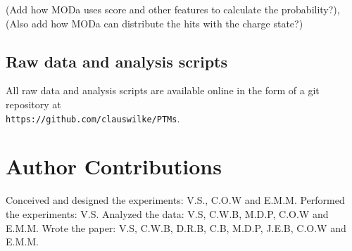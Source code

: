 \documentclass[12pt]{article}
\begin{document}




(Add how MODa uses score and other features to calculate the probability?), (Also add how MODa can distribute the hits with the charge state?)

\subsection{Raw data and analysis scripts}

All raw data and analysis scripts are available online in the form of a git repository at\\ \texttt{https://github.com/clauswilke/PTMs}.


\section{Author Contributions}
Conceived and designed the experiments: V.S., C.O.W and E.M.M. Performed the experiments: V.S. Analyzed the data: V.S, C.W.B, M.D.P, C.O.W and E.M.M. Wrote the paper: V.S, C.W.B, D.R.B, C.B, M.D.P, J.E.B, C.O.W and E.M.M.
\end{document}
